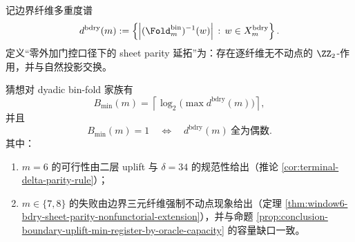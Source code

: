 \begin{conjecture}\label{conj:conclusion-cross-resolution-sheet-parity-min-gating-bits}
记边界纤维多重度谱
\[
d^{\mathrm{bdry}}(m):=
\left\{
\left|(\Fold_m^{\mathrm{bin}})^{-1}(w)\right|
\,:\,
w\in X_m^{\mathrm{bdry}}
\right\}.
\]
定义“零外加门控口径下的 sheet parity 延拓”为：存在逐纤维无不动点的 \(\ZZ_2\)-作用，并与自然投影交换。

猜想对 dyadic bin-fold 家族有
\[
B_{\min}(m)=
\left\lceil\log_2\!\bigl(\max d^{\mathrm{bdry}}(m)\bigr)\right\rceil,
\]
并且
\[
B_{\min}(m)=1
\quad\Longleftrightarrow\quad
d^{\mathrm{bdry}}(m)\ \text{全为偶数}.
\]
其中：
\begin{enumerate}
  \item \(m=6\) 的可行性由二层 uplift 与 \(\delta=34\) 的规范性给出（推论 \ref{cor:terminal-delta-parity-rule}）；
  \item \(m\in\{7,8\}\) 的失败由边界三元纤维强制不动点现象给出（定理 \ref{thm:window6-bdry-sheet-parity-nonfunctorial-extension}），并与命题 \ref{prop:conclusion-boundary-uplift-min-register-by-oracle-capacity} 的容量缺口一致。
\end{enumerate}
\end{conjecture}

